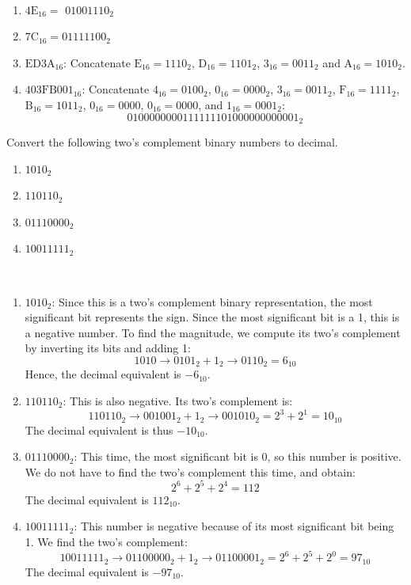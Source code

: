 \documentclass[12pt]{article}
\newenvironment{ex}[2][Exercise]{\begin{trivlist}
		\item[\hskip \labelsep {\bfseries #1}\hskip \labelsep {\bfseries #2.}]}{\end{trivlist}}
\newenvironment{sol}[1][Solution]{\begin{trivlist}
		\item[\hskip \labelsep {\bfseries #1:}]}{\end{trivlist}}
\begin{document}
\begin{sol}\
	\begin{enumerate}[label=(\alph*)]
		\item $\text{4E}_{16}=$ $0100 1110_2$
		\item $\text{7C}_{16}=0111 1100_2$
		\item $\text{ED3A}_{16}$: Concatenate $\text{E}_{16}=1110_2$, $\text{D}_{16}=1101_2$, $\text{3}_{16}=0011_2$ and $\text{A}_{16}=1010_2$.
		\item $\text{403FB001}_{16}$: Concatenate $4_{16}=0100_2$, $0_{16}=0000_2$, $3_{16}=0011_2$, $\text{F}_{16}=1111_2$, $\text{B}_{16}=1011_{2}$, $0_{16}=0000$, $0_{16}=0000$, and $1_{16}=0001_2$:
		\[
		0100000000111111101000000000001_2
		\]
	\end{enumerate}
\end{sol}

\begin{ex}{1.21}
	Convert the following two's complement binary numbers to decimal.
	\begin{enumerate}[label=(\alph*)]
		\item $1010_2$
		\item $110110_2$
		\item $01110000_2$
		\item $10011111_2$
	\end{enumerate}
\end{ex}

\begin{sol}\
	\begin{enumerate}[label=(\alph*)]
		\item $1010_2$: Since this is a two's complement binary representation, the most significant bit represents the sign. Since the most significant bit is a 1, this is a negative number. To find the magnitude, we compute its two's complement by inverting its bits and adding 1:
		\[
		1010 \to 0101_2 + 1_2\to 0110_2=6_{10}
		\]
		Hence, the decimal equivalent is $-6_{10}$.
		\item $110110_2$: This is also negative. Its two's complement is:
		\[
		110110_2\to 001001_2+1_2\to 001010_2=2^{3}+2^{1}=10_{10}
		\]
		The decimal equivalent is thus $-10_{10}$.
		\item $01110000_2$: This time, the most significant bit is 0, so this number is positive. We do not have to find the two's complement this time, and obtain:
		\[
		2^{6}+2^{5}+2^{4}=112
		\]
		The decimal equivalent is $112_{10}$.
		\item $10011111_2$: This number is negative because of its most significant bit being 1. We find the two's complement:
		\[
		10011111_2\to01100000_2+1_2\to01100001_2=2^{6}+2^{5}+2^{0}=97_{10}
		\]
		The decimal equivalent is $-97_{10}$.
	\end{enumerate}
\end{sol}
\end{document}
